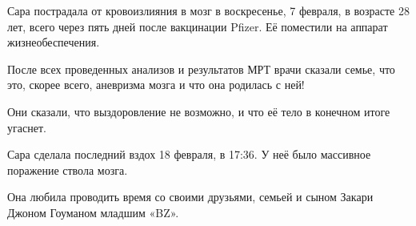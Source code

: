Сара пострадала от кровоизлияния в мозг в воскресенье, 7 февраля, в возрасте 28
лет, всего через пять дней после вакцинации Pfizer. Её поместили на аппарат
жизнеобеспечения.

После всех проведенных анализов и результатов МРТ врачи сказали семье, что это,
скорее всего, аневризма мозга и что она родилась с ней!

Они сказали, что выздоровление не возможно, и что её тело в конечном итоге
угаснет.

Сара сделала последний вздох 18 февраля, в 17:36. У неё было массивное поражение
ствола мозга.

Она любила проводить время со своими друзьями, семьей и сыном Закари Джоном
Гоуманом младшим «BZ».

